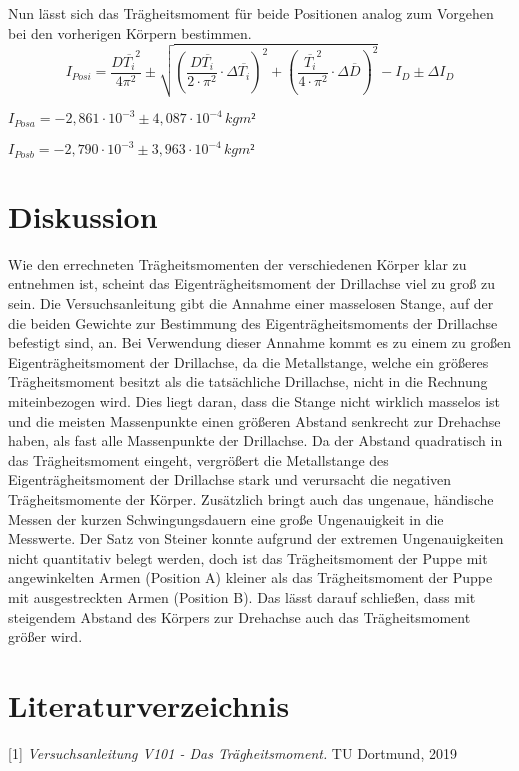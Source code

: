 \documentclass[titlepage = firstcover]{scrartcl}
\begin{document}
      Nun lässt sich das Trägheitsmoment für beide Positionen analog zum Vorgehen bei den vorherigen Körpern bestimmen.
      \begin{equation*}
        I_{Posi} = \frac{D\overline{T_i}^2}{4\pi^2} \pm \sqrt{(\frac{D\overline{T_i}}{2\cdot \pi^2} \cdot \Delta \overline{T_i})^2 + (\frac{\overline{T_i}^2}{4 \cdot \pi^2} \cdot \Delta \overline{D})^2} - I_D \pm \Delta I_D
      \end{equation*}

      $I_{Posa} = -2,861 \cdot 10^{-3} \pm 4,087 \cdot 10^{-4} \, kgm²$ \newline

      $I_{Posb} = -2,790 \cdot 10^{-3} \pm 3,963 \cdot 10^{-4} \, kgm²$
        
      

    \section{Diskussion}
    
      Wie den errechneten Trägheitsmomenten der verschiedenen Körper klar zu entnehmen ist, scheint das Eigenträgheitsmoment der Drillachse viel zu groß zu sein.
      Die Versuchsanleitung gibt die Annahme einer masselosen Stange, auf der die beiden Gewichte zur Bestimmung des Eigenträgheitsmoments der Drillachse befestigt sind, an.
      Bei Verwendung dieser Annahme kommt es zu einem zu großen Eigenträgheitsmoment der Drillachse, da die Metallstange, welche ein größeres Trägheitsmoment besitzt als die tatsächliche Drillachse, nicht in die Rechnung miteinbezogen wird.
      Dies liegt daran, dass die Stange nicht wirklich masselos ist und die meisten Massenpunkte einen größeren Abstand senkrecht zur Drehachse haben, als fast alle Massenpunkte der Drillachse.
      Da der Abstand quadratisch in das Trägheitsmoment eingeht, vergrößert die Metallstange des Eigenträgheitsmoment der Drillachse stark und verursacht die negativen Trägheitsmomente der Körper.
      Zusätzlich bringt auch das ungenaue, händische Messen der kurzen Schwingungsdauern eine große Ungenauigkeit in die Messwerte.
      Der Satz von Steiner konnte aufgrund der extremen Ungenauigkeiten nicht quantitativ belegt werden, doch ist das Trägheitsmoment der Puppe mit angewinkelten Armen (Position A)
      kleiner als das Trägheitsmoment der Puppe mit ausgestreckten Armen (Position B). Das lässt darauf schließen, dass mit steigendem Abstand des Körpers zur Drehachse auch das Trägheitsmoment größer wird. \newpage

    \section{Literaturverzeichnis}
      [1] \textit{Versuchsanleitung V101 - Das Trägheitsmoment.} TU Dortmund, 2019
\end{document}
